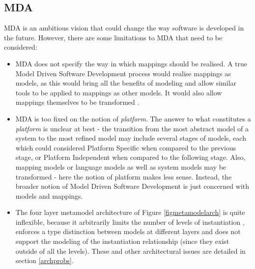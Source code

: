 
\subsection{MDA}

MDA is an ambitious vision that could change the way software is developed in the future. However, there are some limitations to MDA that need to be considered:
\begin{itemize}
\item MDA does not specify the way in which mappings should be realised. A true Model Driven Software Development process would realise mappings as models, as this would bring all the benefits of modeling and allow similar tools to be applied to mappings as other models. It would also allow mappings themselves to be transformed \cite{bezivinmda}.
\item MDA is too fixed on the notion of \emph{platform}. The answer to what constitutes a \emph{platform} is unclear at best - the transition from the most abstract model of a system to the most refined model may include several stages of models, each which could considered Platform Specific when compared to the previous stage, or Platform Independent when compared to the following stage. Also, mapping models or language models as well as system models may be transformed - here the notion of platform makes less sense. Instead, the broader notion of Model Driven Software Development is just concerned with models and mappings.
\item The four layer metamodel architecture of Figure \ref{figmetamodelarch} is quite inflexible, because it arbitrarily limits the number of levels of instantiation \cite{panhorrocks}, enforces a type distinction between models at different layers and does not support the modeling of the instantiation relationship (since they exist outside of all the levels). These and other architectural issues are detailed in section \ref{archprobs}.
\end{itemize}



